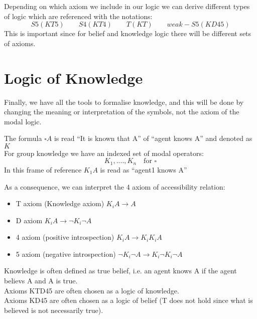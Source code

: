 Depending on which axiom we include in our logic we can derive different types of logic which are referenced with the notations:
\[S5(KT5)\qquad S4(KT4)\qquad T(KT) \qquad weak-S5(KD45)\]
This is important since for belief and knowledge logic there will be different sets of axioms.

\section{Logic of Knowledge}
Finally, we have all the tools to formalise knowledge, and this will be done by changing the meaning or interpretation of the symbols, not the axiom of the modal logic.

The formula $\square A$ is read ``It is known that A'' of ``agent knows A'' and denoted as $K$\\
For group knowledge we have an indexed set of modal operators:
\[K_1, ...., K_n \quad\text{for }\square\]
In this frame of reference $K_1 A$ is read as ``agent1 knows A''

As a consequence, we can interpret the 4 axiom of accessibility relation:
\begin{itemize}
\item T axiom (Knowledge axiom) $K_i A \rightarrow A$\\
\item D axiom $K_i A \rightarrow \neg{K_i} \neg{A}$\\
\item 4 axiom (positive introspection) $K_i A \rightarrow K_i K_i A$\\
\item 5 axiom (negative introspection) $\neg{K_i} \neg{A}\rightarrow K_i \neg{K_i}\neg{A}$\\
\end{itemize}

Knowledge is often defined as true belief, i.e. an agent knows A if the agent believs A and A is true.\\
Axioms KTD45 are often chosen as a logic of knowledge.\\
Axioms KD45 are often chosen as a logic of belief (T does not hold since what is believed is not necessarily true).\\

